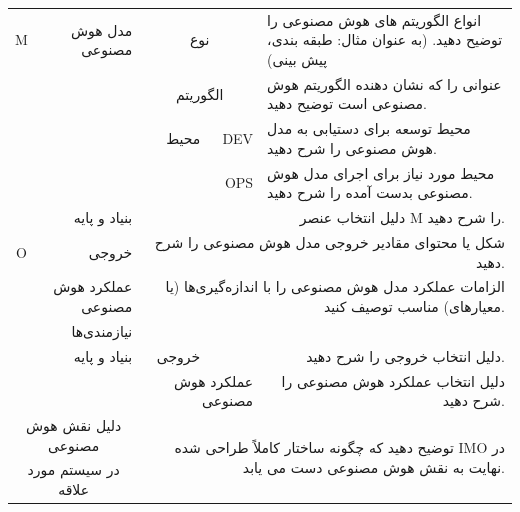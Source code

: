 \documentclass[a4paper,10pt]{article}
\begin{document}
\begin{table}[htbp]
\begin{tabularx}{\textwidth}{c c c c X}
                            \multicolumn{1}{c}{M} & \multicolumn{1}{r}{مدل هوش مصنوعی} & \multicolumn{2}{c}{نوع} & انواع الگوریتم های هوش مصنوعی را توضیح دهید. (به عنوان مثال: طبقه بندی، پیش بینی) \\
                            &  & \multicolumn{2}{c}{الگوریتم} & عنوانی را که نشان دهنده الگوریتم هوش مصنوعی است توضیح دهید. \\
                            &  & \multicolumn{1}{r}{محیط} & \multicolumn{1}{r}{DEV} & محیط توسعه برای دستیابی به مدل هوش مصنوعی را شرح دهید. \\
                            &  &  & \multicolumn{1}{r}{OPS} & محیط مورد نیاز برای اجرای مدل هوش مصنوعی بدست آمده را شرح دهید. \\
                            & \multicolumn{1}{r}{بنیاد و پایه} & \multicolumn{3}{r}{دلیل انتخاب عنصر M را شرح دهید.} \\

                            \multicolumn{1}{c}{O} & \multicolumn{1}{r}{خروجی} & \multicolumn{3}{r}{شکل یا محتوای مقادیر خروجی مدل هوش مصنوعی را شرح دهید.} \\
                            & \multicolumn{1}{r}{عملکرد هوش مصنوعی} & \multicolumn{3}{r}{الزامات عملکرد مدل هوش مصنوعی را با اندازه‌گیری‌ها (یا معیارهای) مناسب توصیف کنید.} \\
                            & \multicolumn{1}{r}{نیازمندی‌ها} &  &  &  \\
                            & \multicolumn{1}{r}{بنیاد و پایه} & \multicolumn{1}{r}{خروجی} &  & \multicolumn{1}{r}{دلیل انتخاب خروجی را شرح دهید.} \\
                            &  & \multicolumn{2}{r}{عملکرد هوش مصنوعی} & \multicolumn{1}{r}{دلیل انتخاب عملکرد هوش مصنوعی را شرح دهید.} \\
                            
                            \multicolumn{2}{c}{دلیل نقش هوش مصنوعی} & \multicolumn{3}{r}{\multirow{2}{*}{توضیح دهید که چگونه ساختار کاملاً طراحی شده IMO در نهایت به نقش هوش مصنوعی دست می یابد.}} \\
                            \multicolumn{2}{c}{در سیستم مورد علاقه} & \\

                            \hline

                        \end{tabularx}
                        
                    \end{table}
\end{document}
